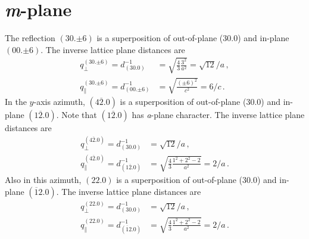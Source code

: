 \section{\textit{m}-plane}
\label{Sec:App_Calc_mPlane}
The reflection $(30.{\pm6})$ is a superposition of out-of-plane (30.0) and in-plane $(00.{\pm6})$.
The inverse lattice plane distances are
\begin{align}
    q_\perp^{(30.{\pm6})}=
    d_{(30.0)}^{-1} &=
    \sqrt{\frac{4}{3}\frac{3^2}{a^2}}
    =\sqrt{12}/a\,,\\
    q_\parallel^{(30.{\pm6})}=
    d_{(00.{\pm6})}^{-1} &=
    \sqrt{\frac{(\pm6)^2}{c^2}}
    =6/c\,.
\end{align}
In the $y$-axis azimuth, $(4\overline{2}.0)$ is a superposition of out-of-plane (30.0) and in-plane $(1\overline{2}.0)$.
Note that $(1\overline{2}.0)$ has \textit{a}-plane character.
The inverse lattice plane distances are
\begin{align}
    q_\perp^{(4\overline{2}.0)}=
    d_{(30.0)}^{-1} &= \sqrt{12}/a\,,\\
    q_\parallel^{(4\overline{2}.0)}=
    d_{(1\overline{2}.0)}^{-1} &=
    \sqrt{\frac{4}{3}\frac{1^2+2^2-2}{a^2}}
    = 2/a\,.
\end{align}
Also in this azimuth, $(22.0)$ is a superposition of out-of-plane (30.0) and in-plane $(\overline{1}2.0)$.
The inverse lattice plane distances are
\begin{align}
    q_\perp^{(22.0)}=
    d_{(30.0)}^{-1} &= \sqrt{12}/a\,,\\
    q_\parallel^{(22.0)}=
    d_{(\overline{1}2.0)}^{-1} &=
    \sqrt{\frac{4}{3}\frac{1^2+2^2-2}{a^2}}
    = 2/a\,.
\end{align}

